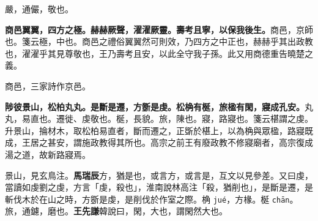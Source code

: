 \begin{quoting}嚴，通儼，敬也。\end{quoting}

\textbf{商邑翼翼，四方之極。赫赫厥聲，濯濯厥靈。壽考且寧，以保我後生。}{\footnotesize 商邑，京師也。箋云極，中也。商邑之禮俗翼翼然可則效，乃四方之中正也，赫赫乎其出政教也，濯濯乎其見尊敬也，王乃壽考且安，以此全守我子孫。此又用商德重告曉楚之義。}

\begin{quoting}商邑，三家詩作京邑。\end{quoting}

\textbf{陟彼景山，松柏丸丸。是斷是遷，方斵是虔。松桷有梴，旅楹有閑，寢成孔安。}{\footnotesize 丸丸，易直也。遷徙、虔敬也。梴，長貌。旅，陳也。寢，路寢也。箋云椹謂之虔。升景山，掄材木，取松柏易直者，斷而遷之，正斲於椹上，以為桷與眾楹，路寢既成，王居之甚安，謂施政教得其所也。高宗之前王有廢政教不修寢廟者，高宗復成湯之道，故新路寢焉。}

\begin{quoting}景山，見玄鳥注。\textbf{馬瑞辰}方，猶是也，或言方，或言是，互文以見參差。又曰虔，當讀如虔劉之虔，方言「虔，殺也」，淮南說林高注「殺，猶削也」，是斷是遷，是斬伐木於在山之時，方斵是虔，是削伐於作室之際。桷 \texttt{jué}，方椽。梴 \texttt{chān}。旅，通鑢，磨也。\textbf{王先謙}韓說曰，閑，大也，謂閑然大也。\end{quoting}

